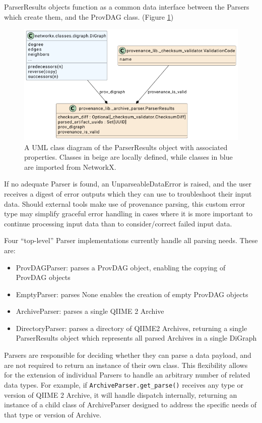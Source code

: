 ParserResults objects function as a common data interface between the Parsers
which create them, and the ProvDAG class. (Figure \ref{fig:ParserResultsUML})

\begin{figure}[htp]
\centering
\includegraphics[width=\textwidth]{figures/ParserResultsUML.png}
\caption[UML Class diagram of the ParserResults class and its components]%
{A UML class diagram of the ParserResults object with associated properties.
Classes in beige are locally defined, while classes in blue are imported from
NetworkX.}
\label{fig:ParserResultsUML}
\end{figure}

If no adequate Parser is found, an UnparseableDataError is raised, and the user
receives a digest of error outputs which they can use to troubleshoot their
input data. Should external tools make use of provenance parsing, this custom
error type may simplify graceful error handling in cases where it is more
important to continue processing input data than to consider/correct failed
input data. 

Four “top-level” Parser implementations currently handle all parsing needs.
These are:
\begin{itemize}
    \item ProvDAGParser: parses a ProvDAG object, enabling the copying of ProvDAG objects
    \item EmptyParser: parses None enables the creation of empty ProvDAG objects
    \item ArchiveParser: parses a single QIIME 2 Archive
    \item DirectoryParser: parses a directory of QIIME2 Archives, returning a single ParserResults object which represents all parsed Archives in a single DiGraph
\end{itemize}

Parsers are responsible for deciding whether they can parse a data payload, and
are not required to return an instance of their own class. This flexibility
allows for the extension of individual Parsers to handle an arbitrary number of
related data types. For example, if \texttt{ArchiveParser.get\_parse()} receives any type
or version of QIIME 2 Archive, it will handle dispatch internally, returning an
instance of a child class of ArchiveParser designed to address the specific
needs of that type or version of Archive.

